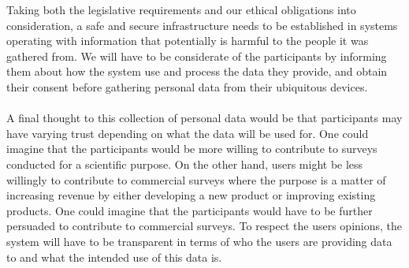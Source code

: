 Taking both the legislative requirements and our ethical obligations into consideration, a safe and secure infrastructure needs to be established in systems operating with information that potentially is harmful to the people it was gathered from. We will have to be considerate of the participants by informing them about how the system use and process the data they provide, and obtain their consent before gathering personal data from their ubiquitous devices.
\\\\
A final thought to this collection of personal data would be that participants may have varying trust depending on what the data will be used for. One could imagine that the participants would be more willing to contribute to surveys conducted for a scientific purpose. On the other hand, users might be less willingly to contribute to commercial surveys where the purpose is a matter of increasing revenue by either developing a new product or improving existing products. One could imagine that the participants would have to be further persuaded to contribute to commercial surveys. To respect the users opinions, the system will have to be transparent in terms of who the users are providing data to and what the intended use of this data is.